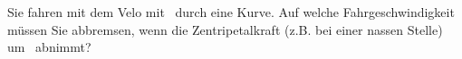 Sie fahren mit dem Velo mit \vVaO\ durch eine Kurve. Auf welche Fahrgeschwindigkeit müssen Sie abbremsen, wenn die Zentripetalkraft (z.B. bei einer nassen Stelle) um \pVaO\ abnimmt?
